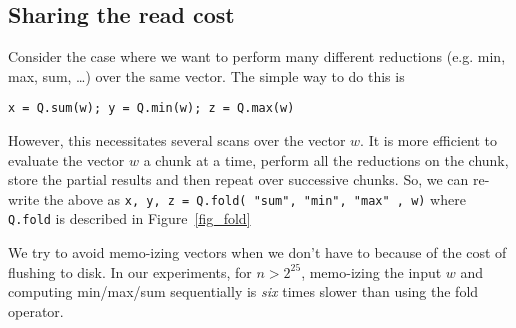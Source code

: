 \subsection{Sharing the read cost}
\label{fold}
Consider the case where we want to perform many different reductions (e.g. min,
max, sum, \ldots) over the same vector. The simple way to do this is
\begin{verbatim}
x = Q.sum(w); y = Q.min(w); z = Q.max(w)
\end{verbatim}
However, this necessitates several scans over the vector \(w\). It is more
efficient to evaluate the vector \(w\) a chunk at a time, perform all the
reductions on the chunk, store the partial results and then repeat over
successive chunks. So, we can re-write the above as 
{\tt x, y, z = Q.fold({ "sum", "min", "max" }, w)}
where {\tt Q.fold} is described in Figure~\ref{fig_fold}

\begin{figure}
\centering
{}
\end{figure}
We try to avoid memo-izing vectors when we don't have to because 
of the cost of flushing to disk. In our experiments, for \(n > 2^{25}\), 
memo-izing the input \(w\) and computing min/max/sum sequentially 
is {\em six} times slower than using the fold operator.
